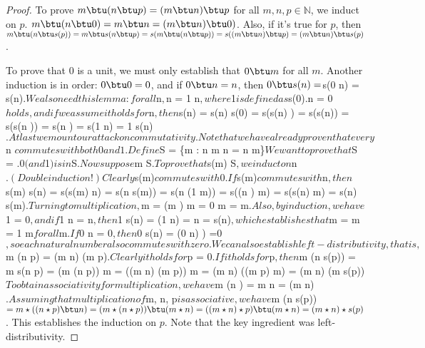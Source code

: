 \begin{proof}

    To prove $m \btu (n \btu p) = (m \btu n) \btu p$ for all $m, n, p \in \mathbb{N}$, we induct on $p$. $m \btu (n \btu 0) = m \btu n = (m \btu n) \btu 0)$. Also, if it's true for $p$, then $m \btu (n \btu s(p)) = m \btu s(n \btu p) = s(m \btu (n \btu p)) = s((m \btu n) \btu p) = (m \btu n) \btu s(p)$.

    To prove that $0$ is a unit, we must only establish that $0 \btu m$ for all $m$. Another induction is in order: $0 \btu 0 = 0$, and if $0 \btu n = n$, then $0 \btu s(n) = $s(0 \btu n) = s(n)$.
    
    We also need this lemma: for all $n$, $n  = 1 \btu n$, where $1$ is defined as $s(0)$. $n = 0$ holds, and if we assume it holds for $n$, then $s(n)  = s(n) \btu s(0) = s(s(n) ) = s(s(n)) = s(s(n )) = s(n ) = s(1 \btu n) = 1 \btu s(n)$.

    At last we mount our attack on commutativity. Note that we have already proven that every $n \in {}$ commutes with both 0 and 1. Define
    
    $S = \{m \in {} : \forall n \in {} m \btu n = n \btu m\}$

    We want to prove that $S = $. $0$ (and $1$) is in $S$. Now suppose $m \in S$. To prove that $s(m) \in S$, we induct on $n \in {}$. (Double induction!) Clearly $s(m)$ commutes with $0$. If $s(m)$ commutes with $n$, then $s(m) \btu s(n) = s(s(m) \btu n) = s(n \btu s(m)) = s(n \btu (1 \btu m)) = s((n ) \btu m) = s(s(n) \btu m) = s(n) \btu s(m)$.

    Turning to multiplication, $m  = (m ) \btu m = 0 \btu m = m$. Also, by induction, we have $1  = 0$, and if $1 \star n = n$, then $1 \star s(n) = (1 \star n)  = n  = s(n)$, which establishes that $m  = m = 1 \star m$ for all $m$.

    If $0 \star n = 0$, then $0 \star s(n) = (0 \star n) ) =0$, so each natural number also commutes with zero.

    We can also establish left-distributivity, that is, $m \star (n \btu p) = (m \star n) \btu (m \star p)$. Clearly it holds for $p = 0$. If it holds for $p$, then $m \star (n \btu s(p)) = m \star s(n \btu p) = (m \star (n \btu p)) \btu m = ((m \star n) \btu (m \star p)) \btu m = (m \star n) \btu ((m \star p) \btu m) = (m \star n) \btu (m \star s(p))$

    To obtain associativity for  multiplication, we have $m \star (n ) = m \star n = (m \star n) $. Assuming that multiplication of $m, n, p$ is associative, we have $m \star (n \star s(p))$ = m \star ((n \star p) \btu n) = (m \star (n \star p)) \btu (m \star n) = ((m \star n) \star p) \btu (m \star n) = (m \star n) \star s(p)$. This establishes the induction on $p$. Note that the key ingredient was left-distributivity.


\end{proof}
